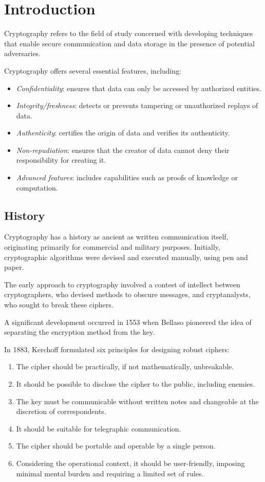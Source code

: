 \section{Introduction}

\begin{definition}
    Cryptography refers to the field of study concerned with developing techniques that enable secure communication and data storage in the presence of potential adversaries.
\end{definition}
Cryptography offers several essential features, including:
\begin{itemize}
    \item \textit{Confidentiality}: ensures that data can only be accessed by authorized entities.
    \item \textit{Integrity/freshness}: detects or prevents tampering or unauthorized replays of data.
    \item \textit{Authenticity}: certifies the origin of data and verifies its authenticity.
    \item \textit{Non-repudiation}: ensures that the creator of data cannot deny their responsibility for creating it.
    \item \textit{Advanced features}: includes capabilities such as proofs of knowledge or computation.
\end{itemize}

\subsection{History}
Cryptography has a history as ancient as written communication itself, originating primarily for commercial and military purposes. 
Initially, cryptographic algorithms were devised and executed manually, using pen and paper.

The early approach to cryptography involved a contest of intellect between cryptographers, who devised methods to obscure messages, and cryptanalysts, who sought to break these ciphers.

A significant development occurred in 1553 when Bellaso pioneered the idea of separating the encryption method from the key.

In 1883, Kerchoff formulated six principles for designing robust ciphers:
\begin{enumerate}
    \item The cipher should be practically, if not mathematically, unbreakable.
    \item It should be possible to disclose the cipher to the public, including enemies.
    \item The key must be communicable without written notes and changeable at the discretion of correspondents.
    \item It should be suitable for telegraphic communication.
    \item The cipher should be portable and operable by a single person.
    \item Considering the operational context, it should be user-friendly, imposing minimal mental burden and requiring a limited set of rules.
\end{enumerate}

